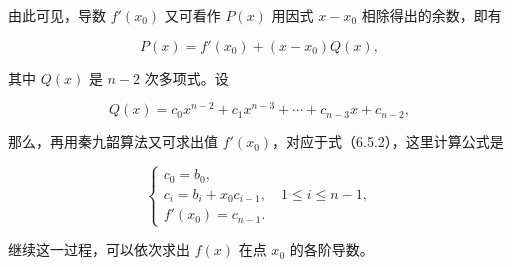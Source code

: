 \documentclass[
  10pt,
  fontset=fandol]{ctexart}
\begin{document}
由此可见，导数 \(f'(x_0)\) 又可看作 \(P(x)\) 用因式 \(x-x_0\) 相除得出的余数，即有

\[
P(x)=f'(x_0)+(x-x_0)Q(x),
\]

其中 \(Q(x)\) 是 \(n-2\) 次多项式。设

\[
Q(x)=c_0x^{n-2}+c_1x^{n-3}+\cdots+c_{n-3}x+c_{n-2},
\]

那么，再用秦九韶算法又可求出值 \(f'(x_0)\)，对应于式（6.5.2），这里计算公式是

\[
\begin{cases}
c_0=b_0,\\
c_i=b_i+x_0c_{i-1},\quad1\leqslant i\leqslant n-1,\\
f'(x_0)=c_{n-1}.
\end{cases}
\tag{6.5.3}
\]

继续这一过程，可以依次求出 \(f(x)\) 在点 \(x_0\) 的各阶导数。
\end{document}
